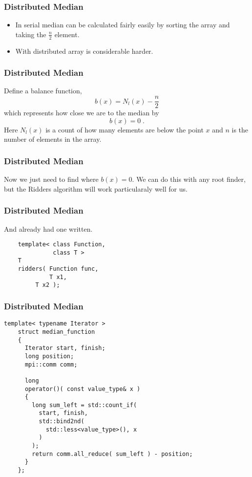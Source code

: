 \begin{frame}
  \frametitle{Distributed Median}
  \begin{itemize}
    \item In serial median can be calculated fairly
  easily by sorting the array and taking
  the $\frac{n}{2}$ element.
  \item With distributed array is considerable harder.
  \end{itemize}
\end{frame}

\begin{frame}
  \frametitle{Distributed Median}
  Define a balance function,
  \[ b(x) = N_l(x) - \frac{n}{2} \]
  which represents how close we are to the median by
  \[ b(x) = 0 \; . \]
  Here $N_l(x)$ is a count of how many elements are below the point $x$
  and $n$ is the number of elements in the array.
\end{frame}

\begin{frame}
  \frametitle{Distributed Median}
  Now we just need to find where $b(x) = 0$. We can do
  this with any root finder, but the Ridders algorithm
  will work particularaly well for us.
\end{frame}

\begin{frame}[fragile]
  \frametitle{Distributed Median}
  And already had one written.
  \begin{example}
    \begin{lstlisting}
    template< class Function,
              class T >
    T
    ridders( Function func,
             T x1,
	     T x2 );
    \end{lstlisting}
  \end{example}
\end{frame}

\begin{frame}[fragile]
  \frametitle{Distributed Median}
  \begin{example}
    \begin{lstlisting}[basicstyle=\tiny\ttfamily]
    template< typename Iterator >
    struct median_function
    {
      Iterator start, finish;
      long position;
      mpi::comm comm;

      long
      operator()( const value_type& x )
      {
        long sum_left = std::count_if(
          start, finish,
          std::bind2nd(
            std::less<value_type>(), x
          )
        );
        return comm.all_reduce( sum_left ) - position;
      }
    };
    \end{lstlisting}
  \end{example}
\end{frame}

